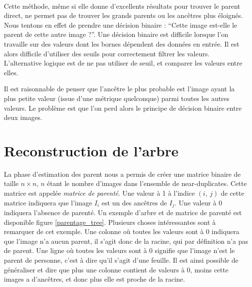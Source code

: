 \documentclass[utf8,final]{stageM2R} %
\begin{document}
\paragraph{}
Cette méthode, même si elle donne d'excellents résultats pour trouver le parent direct, ne permet pas de trouver les grands parents ou les ancêtres plus éloignés. Nous tentons en effet de prendre une décision binaire : ``Cette image est-elle le parent de cette autre image ?''. Une décision binaire est difficile lorsque l'on travaille sur des valeurs dont les bornes dépendent des données en entrée. Il est alors difficile d'utiliser des seuils pour correctement filtrer les valeurs. L'alternative logique est de ne pas utiliser de seuil, et comparer les valeurs entre elles. 

Il est raisonnable de penser que l'ancêtre le plus probable est l'image ayant la plus petite valeur (issue d'une métrique quelconque) parmi toutes les autres valeurs. Le problème est que l'on perd alors le principe de décision binaire entre deux images.

\section{Reconstruction de l'arbre}
\label{sec:reconstruction}
La phase d'estimation des parent nous a permis de créer une matrice binaire de taille $n\times n$, $n$ étant le nombre d'images dans l'ensemble de near-duplicates. Cette matrice est appelée \textit{matrice de parenté}. Une valeur à 1 à l'indice $(i,\ j)$ de cette matrice indiquera que l'image $I_i$ est un des ancêtres de $I_j$. Une valeur à 0 indiquera l'absence de parenté. Un exemple d'arbre et de matrice de parenté est disponible figure \ref{parentage_tree}. Plusieurs choses intéressantes sont à remarquer de cet exemple. Une colonne où toutes les valeurs sont à 0 indiquera que l'image n'a aucun parent, il s'agit donc de la racine, qui par définition n'a pas de parent. Une ligne où toutes les valeurs sont à 0 signifie que l'image n'est le parent de personne, c'est à dire qu'il s'agit d'une feuille. Il est ainsi possible de généraliser et dire que plus une colonne contient de valeurs à 0, moins cette images a d'ancêtres, et donc plus elle  est proche de la racine.
\end{document}

